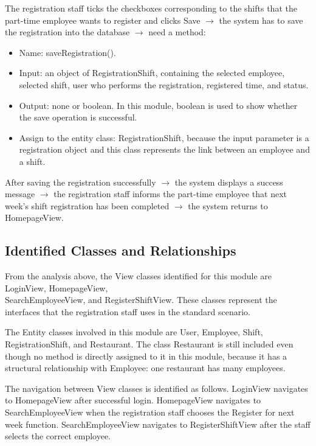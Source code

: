 The registration staff ticks the checkboxes corresponding to the shifts that the part-time employee wants to register and clicks Save $\rightarrow$ the system has to save the registration into the database $\rightarrow$ need a method:

\begin{itemize}
    \item Name: saveRegistration().
    \item Input: an object of RegistrationShift, containing the selected employee, selected shift, user who performs the registration, registered time, and status.
    \item Output: none or boolean. In this module, boolean is used to show whether the save operation is successful.
    \item Assign to the entity class: RegistrationShift, because the input parameter is a registration object and this class represents the link between an employee and a shift.
\end{itemize}

After saving the registration successfully $\rightarrow$ the system displays a success message $\rightarrow$ the registration staff informs the part-time employee that next week's shift registration has been completed $\rightarrow$ the system returns to HomepageView.

\subsection{Identified Classes and Relationships}

From the analysis above, the View classes identified for this module are LoginView, HomepageView,\\ SearchEmployeeView, and RegisterShiftView. These classes represent the interfaces that the registration staff uses in the standard scenario.

The Entity classes involved in this module are User, Employee, Shift, RegistrationShift, and Restaurant. The class Restaurant is still included even though no method is directly assigned to it in this module, because it has a structural relationship with Employee: one restaurant has many employees.

The navigation between View classes is identified as follows. LoginView navigates to HomepageView after successful login. HomepageView navigates to SearchEmployeeView when the registration staff chooses the Register for next week function. SearchEmployeeView navigates to RegisterShiftView after the staff selects the correct employee.

